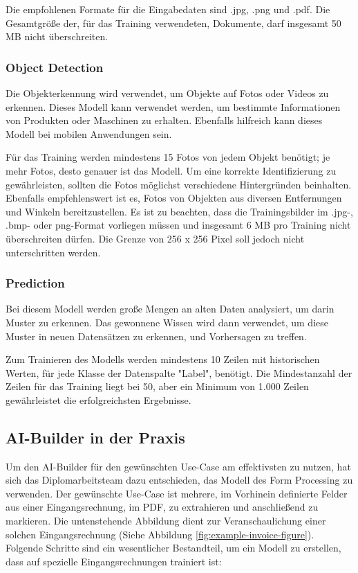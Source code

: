 Die empfohlenen Formate für die Eingabedaten sind .jpg, .png und .pdf. Die Gesamtgröße der, für das Training verwendeten, Dokumente, darf insgesamt 50 MB nicht überschreiten.

\subsubsection{Object Detection}

Die Objekterkennung wird verwendet, um Objekte auf Fotos oder Videos zu erkennen. Dieses Modell kann verwendet werden, um bestimmte Informationen von Produkten oder Maschinen zu erhalten. Ebenfalls hilfreich kann dieses Modell bei mobilen Anwendungen sein.

Für das Training werden mindestens 15 Fotos von jedem Objekt benötigt; je mehr Fotos, desto genauer ist das Modell.  Um eine korrekte Identifizierung zu gewährleisten, sollten die Fotos möglichst verschiedene Hintergründen beinhalten. Ebenfalls empfehlenswert ist es, Fotos von Objekten aus diversen Entfernungen und Winkeln bereitzustellen. Es ist zu beachten, dass die Trainingsbilder im .jpg-, .bmp- oder png-Format vorliegen müssen und insgesamt 6 MB pro Training nicht überschreiten dürfen. Die Grenze von 256 x 256 Pixel soll jedoch nicht unterschritten werden.

\subsubsection{Prediction}

Bei diesem Modell werden große Mengen an alten Daten analysiert, um darin Muster zu erkennen. Das gewonnene Wissen wird dann verwendet, um diese Muster in neuen Datensätzen zu erkennen, und Vorhersagen zu treffen.

Zum Trainieren des Modells werden mindestens 10 Zeilen mit historischen Werten, für jede Klasse der Datenspalte "Label", benötigt. Die Mindestanzahl der Zeilen für das Training liegt bei 50, aber ein Minimum von 1.000 Zeilen gewährleistet die erfolgreichsten Ergebnisse.

\subsection{AI-Builder in der Praxis}

Um den AI-Builder für den gewünschten Use-Case am effektivsten zu nutzen, hat sich das Diplomarbeitsteam dazu entschieden, das Modell des Form Processing zu verwenden. Der gewünschte Use-Case ist mehrere, im Vorhinein definierte Felder aus einer Eingangsrechnung, im PDF, zu extrahieren und anschließend zu markieren.
Die untenstehende Abbildung dient zur Veranschaulichung einer solchen Eingangsrechnung (Siehe Abbildung \ref{fig:example-invoice-figure}). Folgende Schritte sind ein wesentlicher Bestandteil, um ein Modell zu erstellen, dass auf spezielle Eingangsrechnungen trainiert ist:

